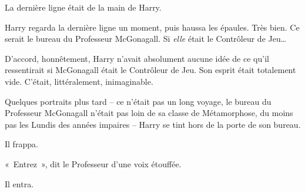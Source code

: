 La dernière ligne était de la main de Harry.

Harry regarda la dernière ligne un moment, puis haussa les épaules. Très bien. Ce serait le bureau du Professeur McGonagall. Si \emph{elle} était le Contrôleur de Jeu…

D'accord, honnêtement, Harry n'avait absolument aucune idée de ce qu'il ressentirait si McGonagall était le Contrôleur de Jeu. Son esprit était totalement vide. C'était, littéralement, inimaginable.

Quelques portraits plus tard -- ce n'était pas un long voyage, le bureau du Professeur McGonagall n'était pas loin de sa classe de Métamorphose, du moins pas les Lundis des années impaires -- Harry se tint hors de la porte de son bureau.

Il frappa.

«~Entrez~», dit le Professeur d'une voix étouffée.

Il entra.

